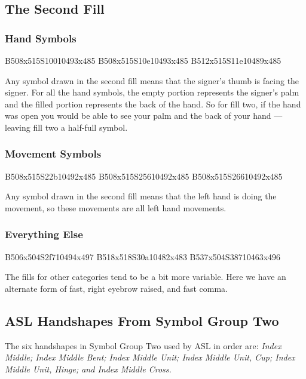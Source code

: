 \documentclass{article}
\begin{document}
\subsection{The Second Fill}

\subsubsection{Hand Symbols}

\begin{center}
B508x515S10010493x485 B508x515S10e10493x485 B512x515S11e10489x485
\end{center}

Any symbol drawn in the second fill means that the signer's thumb is facing the signer.
For all the hand symbols, the empty portion represents the signer's palm and the filled portion represents the back of the hand.
So for fill two, if the hand was open you would be able to see your palm and the back of your hand --- leaving fill two a half-full symbol.

\subsubsection{Movement Symbols}

\begin{center}
B508x515S22b10492x485 B508x515S25610492x485 B508x515S26610492x485
\end{center}

Any symbol drawn in the second fill means that the left hand is doing the movement, so these movements are all left hand movements.

\subsubsection{Everything Else}

\begin{center}
B506x504S2f710494x497 B518x518S30a10482x483 B537x504S38710463x496
\end{center}

The fills for other categories tend to be a bit more variable.
Here we have an alternate form of fast, right eyebrow raised, and fast comma.

\subsection{ASL Handshapes From Symbol Group Two}

The six handshapes in Symbol Group Two used by ASL in order are:
{\it
Index Middle;
Index Middle Bent;
Index Middle Unit;
Index Middle Unit, Cup;
Index Middle Unit, Hinge;
and Index Middle Cross.
}
\end{document}
